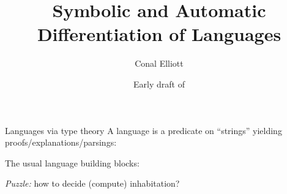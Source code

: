 \documentclass[aspectratio=169]{beamer}
\title{Symbolic and Automatic Differentiation of Languages}
\author{Conal Elliott}
\date{Early draft of \DTMnow}
\begin{document}
\begin{center}
\maketitle
{}
\end{center}

\begin{frame}{Languages via type theory}
\vspace{1.5ex}
A language is a predicate on ``strings'' yielding proofs/explanations/parsings:

The usual language building blocks:

\vspace{-3ex}

\emph{Puzzle:} how to decide (compute) inhabitation?
\end{frame}


\end{document}

